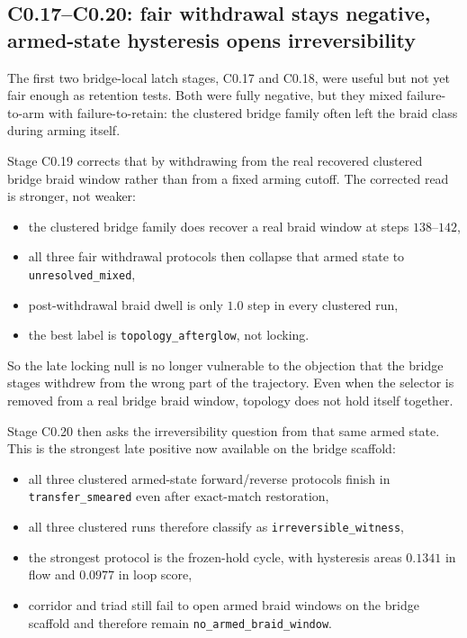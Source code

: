 \documentclass[11pt]{article}
\begin{document}
\subsection{C0.17--C0.20: fair withdrawal stays negative, armed-state hysteresis opens irreversibility}

The first two bridge-local latch stages, C0.17 and C0.18, were useful but not yet fair enough as retention tests. Both were fully negative, but they mixed failure-to-arm with failure-to-retain: the clustered bridge family often left the braid class during arming itself.

Stage C0.19 corrects that by withdrawing from the real recovered clustered bridge braid window rather than from a fixed arming cutoff. The corrected read is stronger, not weaker:
\begin{itemize}
\item the clustered bridge family does recover a real braid window at steps $138$--$142$,
\item all three fair withdrawal protocols then collapse that armed state to \texttt{unresolved\_mixed},
\item post-withdrawal braid dwell is only $1.0$ step in every clustered run,
\item the best label is \texttt{topology\_afterglow}, not locking.
\end{itemize}
So the late locking null is no longer vulnerable to the objection that the bridge stages withdrew from the wrong part of the trajectory. Even when the selector is removed from a real bridge braid window, topology does not hold itself together.

Stage C0.20 then asks the irreversibility question from that same armed state. This is the strongest late positive now available on the bridge scaffold:
\begin{itemize}
\item all three clustered armed-state forward/reverse protocols finish in \texttt{transfer\_smeared} even after exact-match restoration,
\item all three clustered runs therefore classify as \texttt{irreversible\_witness},
\item the strongest protocol is the frozen-hold cycle, with hysteresis areas $0.1341$ in flow and $0.0977$ in loop score,
\item corridor and triad still fail to open armed braid windows on the bridge scaffold and therefore remain \texttt{no\_armed\_braid\_window}.
\end{itemize}
\end{document}
